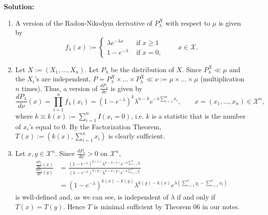 \documentclass[12pt]{article}
\begin{document}
{\bf Solution:}
\begin{enumerate}[label=(\alph*)]
  \item A version of the Radon-Nikodym derivative of $P_{\lambda}^{X}$ with respect to $\mu$ is given by 
    \[ f_{\lambda}(x) := \left\{ \begin{array}{cl}
          \lambda e^{-\lambda x} & \text{ if } x \geq 1 \\
          1 - e^{-\lambda} & \text{ if } x = 0,
      \end{array} \right. \qquad x \in \mathcal{X}.
    \]

  \item Let $X := (X_{1}, \dots, X_{n})$. Let $P_{\lambda}$ be the distribution of $X$. Since $P_{\lambda}^{X} \ll \mu$ and the $X_{i}$'s are
    independent, $P = P_{\lambda}^{X} \times \dots \times P_{\lambda}^{X} \ll \nu := \mu \times \dots \times \mu$ (multiplication $n$ times).
    Thus, a version of $\frac{dP_{\lambda}}{d\nu}$ is given by 
    \[ \frac{dP_{\lambda}}{d\nu}(x) = \prod_{i=1}^{n}f_{\lambda}(x_{i}) = (1 - e^{-\lambda})^{k}\lambda^{n - k}e^{-\lambda\sum_{i=1}^{n}x_{i}}, 
    \qquad x = (x_{1}, \dots, x_{n}) \in \mathcal{X}^{n}, \]
    where $k \equiv k(x) := \sum_{i=1}^{n}I(x_{i} = 0)$, i.e. $k$ is a statistic that is the number of $x_{i}$'s equal to 0.
    By the Factorization Theorem, $T(x) := \left(k(x), \sum_{i=1}^{n}x_{i}\right)$ is clearly sufficient.

  \item Let $x,y \in \mathcal{X}^{n}$. Since $\frac{dP_{\lambda}}{d\nu} > 0$ on $\mathcal{X}^{n}$, 
    \begin{align*}
    \frac{ \frac{dP_{\lambda}}{d\nu}(x) }{ \frac{dP_{\lambda}}{d\nu}(y)} & = \frac{ (1-e^{-\lambda})^{k(x)}\lambda^{n - k(x)}e^{-\lambda
    \sum_{i=1}^{n}y_{i}} }{ (1-e^{-\lambda})^{k(y)}\lambda^{n - k(y)}e^{-\lambda \sum_{i=1}^{n}y_{i}} } \\
    & = (1 - e^{-\lambda})^{k(x) - k(y)} \lambda^{k(y) - k(x)}e^{\lambda\left( \sum_{i=1}^{n}y_{i} - \sum_{i=1}^{n}x_{i}\right)}
  \end{align*}
  is well-defined and, as we can see, is independent of $\lambda$ if and only if $T(x) = T(y)$. Hence $T$ is minimal sufficient by Theorem 06 in our
  notes.
\end{enumerate}



\newpage
\end{document}
